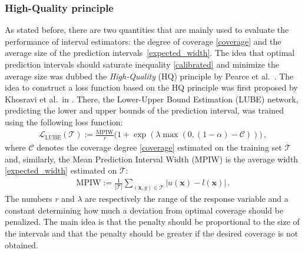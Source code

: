 \documentclass[smallcondensed]{svjour3}
\begin{document}
\subsubsection*{High-Quality principle}

    As stated before, there are two quantities that are mainly used to evaluate the performance of interval estimators: the degree of coverage \eqref{coverage} and the average size of the prediction intervals~\eqref{expected_width}. The idea that optimal prediction intervals should saturate inequality \eqref{calibrated} and minimize the average size was dubbed the \textit{High-Quality} (HQ) principle by Pearce et al.\ \cite{pearce2020uncertainty,pearce2018high}. The idea to construct a loss function based on the HQ principle was first proposed by Khosravi et al.\ in \cite{khosravi2010lower}. There, the Lower-Upper Bound Estimation (LUBE) network, predicting the lower and upper bounds of the prediction interval, was trained using the following loss function:
    \begin{gather}
        \mathcal{L}_\mathrm{LUBE}(\mathcal{T}) := \frac{\mathrm{MPIW}}{r}\big(1 + \exp(\lambda\max(0, (1-\alpha) - \mathcal{C}))\big)\,,
    \end{gather}
    where $\mathcal{C}$ denotes the coverage degree \eqref{coverage} estimated on the training set $\mathcal{T}$ and, similarly, the Mean Prediction Interval Width (MPIW) is the average width \eqref{expected_width} estimated on $\mathcal{T}$:
    \begin{gather}
        \mathrm{MPIW} := \frac{1}{|\mathcal{T}|}\sum_{(\mathbf{x},y)\in\mathcal{T}}|u(\mathbf{x}) - l(\mathbf{x})|\,.
    \end{gather}
    The numbers $r$ and $\lambda$ are respectively the range of the response variable and a constant determining how much a deviation from optimal coverage should be penalized. The main idea is that the penalty should be proportional to the size of the intervals and that the penalty should be greater if the desired coverage is not obtained.
\end{document}
